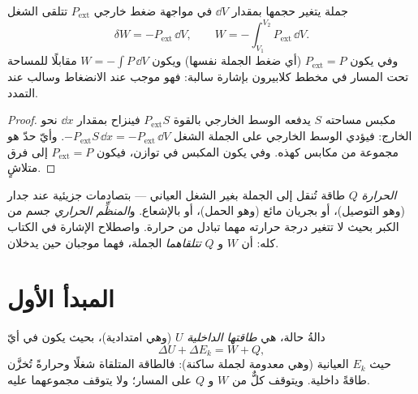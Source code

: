 \begin{proposition}\label{prop:b1:first-law:work}
جملة يتغير حجمها بمقدار $\dd V$ في مواجهة ضغط خارجي
$P_{\mathrm{ext}}$ تتلقى الشغل
\[
\delta W = -P_{\mathrm{ext}}\,\dd V, \qquad
W = -\int_{V_1}^{V_2}P_{\mathrm{ext}}\,\dd V .
\]
وفي  يكون $P_{\mathrm{ext}} = P$ (أي ضغط الجملة
نفسها) ويكون $W = -\int P\,\dd V$ مقابلًا للمساحة تحت المسار في
مخطط كلابيرون بإشارة سالبة: فهو موجب عند الانضغاط وسالب عند التمدد.
\end{proposition}

\begin{proof}
مكبس مساحته $S$ يدفعه الوسط الخارجي بالقوة
$P_{\mathrm{ext}}S$ فينزاح بمقدار $\dd x$ نحو الخارج: فيؤدي الوسط الخارجي
على الجملة الشغل $-P_{\mathrm{ext}}S\,\dd x = -P_{\mathrm{ext}}\,\dd V$. وأيّ
حدّ هو مجموعة من مكابس كهذه. وفي  يكون المكبس في
توازن، فيكون $P_{\mathrm{ext}} = P$ إلى فرق متلاشٍ.
\end{proof}

\begin{definition}[الحرارة]\label{def:b1:first-law:heat}
\emph{الحرارة} $Q$ طاقة تُنقل إلى الجملة بغير الشغل
العياني --- بتصادمات جزيئية عند جدار (وهو التوصيل)، أو
بجريان مائع (وهو الحمل)، أو بالإشعاع. و\emph{المنظِّم الحراري}
جسم من الكبر بحيث لا تتغير درجة حرارته
مهما تبادل من حرارة. واصطلاح الإشارة في الكتاب كله: أن $W$ و $Q$
\emph{تتلقاهما} الجملة، فهما موجبان حين يدخلان.
\end{definition}

\section{المبدأ الأول}

\begin{theorem}\label{thm:b1:first-law:firstlaw}
 دالةُ حالة، هي \emph{طاقتها الداخلية}
$U$ (وهي امتدادية)، بحيث يكون في أيّ 
\[
\Delta U + \Delta E_{k} = W + Q ,
\]
حيث $E_k$  العيانية (وهي معدومة لجملة ساكنة):
فالطاقة المتلقاة شغلًا وحرارةً تُخزَّن طاقةً داخلية. ويتوقف كلٌّ
من $W$ و $Q$ على المسار؛ ولا يتوقف مجموعهما عليه.
\end{theorem}
\admitted

